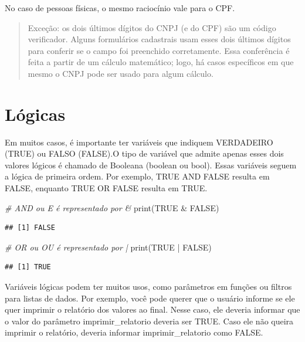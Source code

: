 \documentclass[
]{book}
\newenvironment{Shaded}{\begin{snugshade}}{\end{snugshade}}
\newcommand{\CommentTok}[1]{\textcolor[rgb]{0.56,0.35,0.01}{\textit{#1}}}
\newcommand{\ConstantTok}[1]{\textcolor[rgb]{0.00,0.00,0.00}{#1}}
\newcommand{\FunctionTok}[1]{\textcolor[rgb]{0.00,0.00,0.00}{#1}}
\newcommand{\NormalTok}[1]{#1}
\newcommand{\SpecialCharTok}[1]{\textcolor[rgb]{0.00,0.00,0.00}{#1}}
\begin{document}
No caso de pessoas físicas, o mesmo raciocínio vale para o CPF.

\begin{quote}
Exceção: os dois últimos dígitos do CNPJ (e do CPF) são um código verificador. Alguns formulários cadastrais usam esses dois últimos dígitos para conferir se o campo foi preenchido corretamente. Essa conferência é feita a partir de um cálculo matemático; logo, há casos específicos em que mesmo o CNPJ pode ser usado para algum cálculo.
\end{quote}

\hypertarget{luxf3gicas}{%
\section{Lógicas}\label{luxf3gicas}}

Em muitos casos, é importante ter variáveis que indiquem VERDADEIRO (TRUE) ou FALSO (FALSE).O tipo de variável que admite apenas esses dois valores lógicos é chamado de Booleana (boolean ou bool). Essas variáveis seguem a lógica de primeira ordem. Por exemplo, TRUE AND FALSE resulta em FALSE, enquanto TRUE OR FALSE resulta em TRUE.

\begin{Shaded}
\begin{Highlighting}[]
\CommentTok{\# AND ou E é representado por \&}
\FunctionTok{print}\NormalTok{(}\ConstantTok{TRUE} \SpecialCharTok{\&} \ConstantTok{FALSE}\NormalTok{)}
\end{Highlighting}
\end{Shaded}

\begin{verbatim}
## [1] FALSE
\end{verbatim}

\begin{Shaded}
\begin{Highlighting}[]
\CommentTok{\# OR ou OU é representado por |}
\FunctionTok{print}\NormalTok{(}\ConstantTok{TRUE} \SpecialCharTok{|} \ConstantTok{FALSE}\NormalTok{) }
\end{Highlighting}
\end{Shaded}

\begin{verbatim}
## [1] TRUE
\end{verbatim}

Variáveis lógicas podem ter muitos usos, como parâmetros em funções ou filtros para listas de dados. Por exemplo, você pode querer que o usuário informe se ele quer imprimir o relatório dos valores ao final. Nesse caso, ele deveria informar que o valor do parâmetro imprimir\_relatorio deveria ser TRUE. Caso ele não queira imprimir o relatório, deveria informar imprimir\_relatorio como FALSE.
\end{document}
